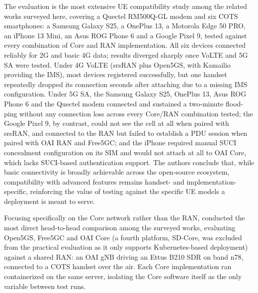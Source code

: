 The evaluation is the most extensive \gls{UE} compatibility study among the related works surveyed here, covering a Quectel RM500Q-GL modem and six \gls{COTS} smartphones: a Samsung Galaxy S25, a OnePlus 13, a Motorola Edge 50 PRO, an iPhone 13 Mini, an Asus ROG Phone 6 and a Google Pixel 9, tested against every combination of Core and \gls{RAN} implementation. All six devices connected reliably for 2G and basic 4G data; results diverged sharply once VoLTE and 5G \gls{SA} were tested. Under 4G VoLTE (srsRAN plus Open5GS, with Kamailio providing the IMS), most devices registered successfully, but one handset repeatedly dropped its connection seconds after attaching due to a missing IMS configuration. Under 5G \gls{SA}, the Samsung Galaxy S25, OnePlus 13, Asus ROG Phone 6 and the Quectel modem connected and sustained a two-minute flood-ping without any connection loss across every Core/\gls{RAN} combination tested; the Google Pixel 9, by contrast, could not see the cell at all when paired with srsRAN, and connected to the \gls{RAN} but failed to establish a \gls{PDU} session when paired with \gls{OAI} \gls{RAN} and Free5GC; and the iPhone required manual \gls{SUCI} concealment configuration on its SIM and would not attach at all to \gls{OAI} Core, which lacks \gls{SUCI}-based authentication support. The authors conclude that, while basic connectivity is broadly achievable across the open-source ecosystem, compatibility with advanced features remains handset- and implementation-specific, reinforcing the value of testing against the specific \gls{UE} models a deployment is meant to serve.

Focusing specifically on the Core network rather than the \gls{RAN}, \textcite{barbosa2025opensource} conducted the most direct head-to-head comparison among the surveyed works, evaluating Open5GS, Free5GC and \gls{OAI} Core (a fourth platform, SD-Core, was excluded from the practical evaluation as it only supports Kubernetes-based deployment) against a shared \gls{RAN}: an \gls{OAI} \gls{gNB} driving an Ettus B210 \gls{SDR} on band n78, connected to a \gls{COTS} handset over the air. Each Core implementation ran containerized on the same server, isolating the Core software itself as the only variable between test runs.

